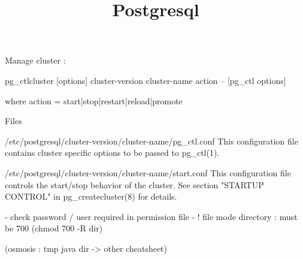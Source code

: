 


\title{Postgresql\bigskip
}
\author{}
\date{}


\maketitle

\justify



Manage cluster : 

pg_ctlcluster [options] cluster-version cluster-name action -- [pg_ctl options]

       where action = start|stop|restart|reload|promote
       
       
       Files
       
       /etc/postgresql/cluster-version/cluster-name/pg_ctl.conf
           This configuration file contains cluster specific options to be passed to pg_ctl(1).

       /etc/postgresql/cluster-version/cluster-name/start.conf
           This configuration file controls the start/stop behavior of the cluster. See section
           "STARTUP CONTROL" in pg_createcluster(8) for details.



- check password / user required in permission file
- ! file mode directory : must be 700 (chmod 700 -R dir)

(osmosis : tmp java dir -> other cheatsheet)





%
%



